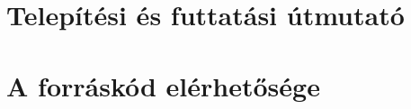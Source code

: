 \chapter{Telepítési és futtatási útmutató}
\label{app:telepites}

\chapter{A forráskód elérhetősége}
